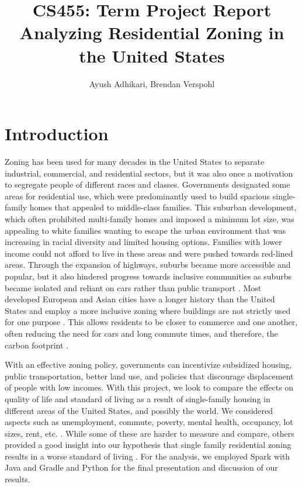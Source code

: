 \documentclass[titlepage]{article}
\begin{document}
\title{
  CS455: Term Project Report\\
  \large Analyzing Residential Zoning in the United States\\
}

\author{Ayush Adhikari, Brendan Verspohl}

\maketitle

\section{Introduction}
Zoning has been used for many decades in the United States to separate industrial, commercial, and residential sectors, but it was also once a motivation to segregate people of different races and classes. Governments designated some areas for residential use, which were predominantly used to build spacious single-family homes that appealed to middle-class families. This suburban development, which often prohibited multi-family homes and imposed a minimum lot size, was appealing to white families wanting to escape the urban environment that was increasing in racial diversity and limited housing options. Families with lower income could not afford to live in these areas and were pushed towards red-lined areas. Through the expansion of highways, suburbs became more accessible and popular, but it also hindered progress towards inclusive communities as suburbs became isolated and reliant on cars rather than public transport \cite{freemark}. Most developed European and Asian cities have a longer history than the United States and employ a more inclusive zoning where buildings are not strictly used for one purpose \cite{hertz}. This allows residents to be closer to commerce and one another, often reducing the need for cars and long commute times, and therefore, the carbon footprint \cite{romem}. 

With an effective zoning policy, governments can incentivize subsidized housing, public transportation, better land use, and policies that discourage displacement of people with low incomes. With this project, we look to compare the effects on quality of life and standard of living as a result of single-family housing in different areas of the United States, and possibly the world. We considered aspects such as unemployment, commute, poverty, mental health, occupancy, lot sizes, rent, etc. \cite{kaggle}. While some of these are harder to measure and compare, others provided a good insight into our hypothesis that single family residential zoning results in a worse standard of living \cite{uscensus}. For the analysis, we employed Spark with Java and Gradle and Python for the final presentation and discussion of our results. 
\end{document}
